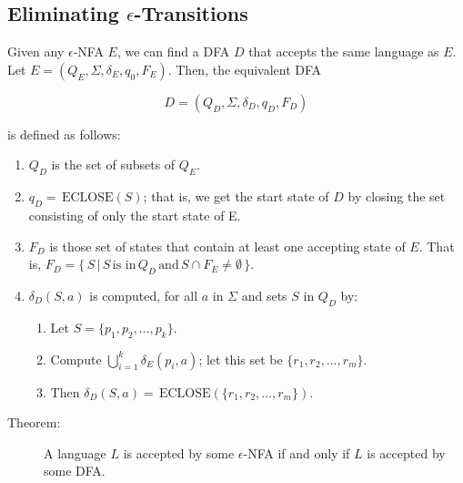 \documentclass[]{article}
\begin{document}
  \subsection*{Eliminating $\epsilon$-Transitions}
    Given any $\epsilon$-NFA $E$, we can find a DFA $D$ that accepts the same
    language as $E$. Let $E = (Q_E, \Sigma, \delta_E, q_0, F_E)$. Then, the
    equivalent DFA

      \[ D = (Q_D, \Sigma, \delta_D, q_D, F_D) \]

    is defined as follows:
      \begin{enumerate}
        \item $Q_D$ is the set of subsets of $Q_E$.
        \item $q_D = \, \text{ECLOSE}(S)$; that is, we get the start state of
        $D$ by closing the set consisting of only the start state of E.
        \item $F_D$ is those set of states that contain at least one accepting
        state of $E$. That is, $F_D = \{ \, S \, | \, S \, \text{is in} \, Q_D
        \, \text{and} \, S \cap F_E \neq \emptyset \, \}$.
        \item $\delta_D(S,a)$ is computed, for all $a$ in $\Sigma$ and sets $S
        $ in $Q_D$ by:
          \begin{enumerate}
            \item Let $S = \{p_1, p_2, \ldots, p_k\}$.
            \item Compute $\bigcup^k_{i=1} \delta_E(p_i,a)$; let this set be
            $\{r_1, r_2, \ldots, r_m\}$.
            \item Then $\delta_D(S,a) = \, \text{ECLOSE}(\{r_1,r_2,\ldots,r_m
            \})$.
          \end{enumerate}
      \end{enumerate}
      \begin{description}
        \item[Theorem:] A language $L$ is accepted by some $\epsilon$-NFA if
        and only if $L$ is accepted by some DFA.
      \end{description}
\end{document}
